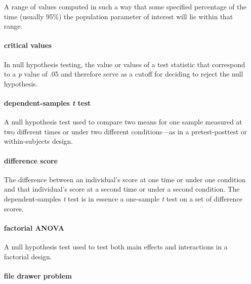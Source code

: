 \documentclass[
]{krantz}
\begin{document}
A range of values computed in such a way that some specified percentage of the time (usually 95\%) the population parameter of interest will lie within that range.

\hypertarget{critical-values}{%
\paragraph*{critical values}\label{critical-values}}

In null hypothesis testing, the value or values of a test statistic that correspond to a \emph{p} value of .05 and therefore serve as a cutoff for deciding to reject the null hypothesis.

\hypertarget{dependent-samples-t-test}{%
\paragraph*{\texorpdfstring{dependent-samples \emph{t} test}{dependent-samples t test}}\label{dependent-samples-t-test}}

A null hypothesis test used to compare two means for one sample measured at two different times or under two different conditions---as in a pretest-posttest or within-subjects design.

\hypertarget{difference-score}{%
\paragraph*{difference score}\label{difference-score}}

The difference between an individual's score at one time or under one condition and that individual's score at a second time or under a second condition. The dependent-samples \emph{t} test is in essence a one-sample \emph{t} test on a set of difference scores.

\hypertarget{factorial-anova-1}{%
\paragraph*{factorial ANOVA}\label{factorial-anova-1}}

A null hypothesis test used to test both main effects and interactions in a factorial design.

\hypertarget{file-drawer-problem}{%
\paragraph*{file drawer problem}\label{file-drawer-problem}}
\end{document}
